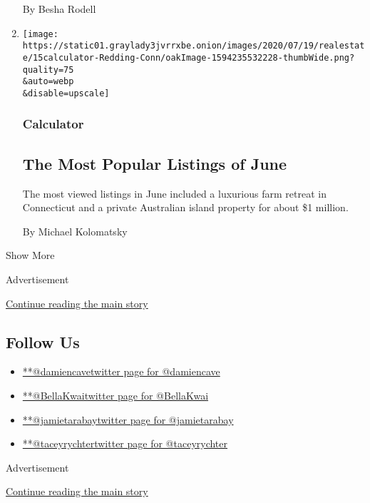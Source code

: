 \begin{enumerate}
  By Besha Rodell
\item
  \href{/2020/07/16/realestate/the-most-popular-listings-of-june.html}{}

  \texttt{[image: https://static01.graylady3jvrrxbe.onion/images/2020/07/19/realestate/15calculator-Redding-Conn/oakImage-1594235532228-thumbWide.png?quality=75\\\&auto=webp\\\&disable=upscale]}

  \hypertarget{calculator}{%
  \subsubsection{Calculator}\label{calculator}}

  \hypertarget{the-most-popular-listings-of-june}{%
  \subsection{The Most Popular Listings of
  June}\label{the-most-popular-listings-of-june}}

  The most viewed listings in June included a luxurious farm retreat in
  Connecticut and a private Australian island property for about \$1
  million.

  By Michael Kolomatsky
\end{enumerate}

Show More

Advertisement

\protect\hyperlink{after-mid1}{Continue reading the main story}

\hypertarget{follow-us}{%
\subsection{Follow Us}\label{follow-us}}

\begin{itemize}
\tightlist
\item
  \href{https://twitter.com/damiencave}{**@damiencavetwitter page for
  @damiencave}
\item
  \href{https://twitter.com/BellaKwai}{**@BellaKwaitwitter page for
  @BellaKwai}
\item
  \href{https://twitter.com/jamietarabay}{**@jamietarabaytwitter page
  for @jamietarabay}
\item
  \href{https://twitter.com/taceyrychter}{**@taceyrychtertwitter page
  for @taceyrychter}
\end{itemize}

Advertisement

\protect\hyperlink{after-mktg}{Continue reading the main story}

